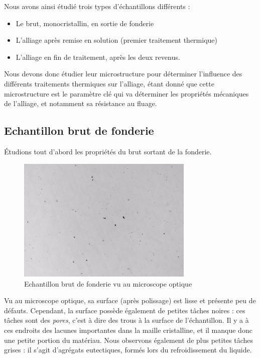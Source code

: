 Nous avons ainsi étudié trois types d'échantillons différents :\\
\begin{itemize}
    \item Le brut, monocristallin, en sortie de fonderie
    \item L'alliage après remise en solution (premier traitement thermique)
    \item L'alliage en fin de traitement, après les deux revenus.\\
\end{itemize}


Nous devons donc étudier leur microstructure pour déterminer l'influence des 
différents traitements thermiques sur l'alliage, étant donné que cette microstructure
est le paramètre clé qui va déterminer les propriétés mécaniques de l'alliage,
et notamment sa résistance au fluage.

\subsection*{Echantillon brut de fonderie}

Étudions tout d'abord les propriétés du brut sortant de la fonderie.\\


\begin{figure}[H]
    \centering
    \includegraphics[width=0.75\textwidth]{images_optique/brut2.pdf}
    \caption{Echantillon brut de fonderie vu au microscope optique}
    \label{fig:brut_optique}
\end{figure}


Vu au microscope optique, sa surface (après polissage) est lisse
et présente peu de défauts. Cependant, la surface possède 
également de petites tâches noires : ces tâches sont des \emph{pores},
c'est à dire des trous à la surface de l'échantillon. Il y a à ces endroits 
des lacunes importantes dans la maille cristalline, et il manque donc 
une petite portion du matériau. Nous observons également de plus 
petites tâches grises : il s'agit d'agrégats eutectiques, formés 
lors du refroidissement du liquide.\\



